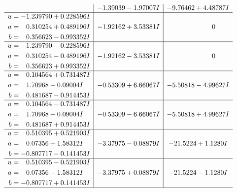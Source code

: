 \documentclass[1p]{elsarticle_modified}
\theoremstyle{definition}
\begin{document}
$$\begin{array}{c|c|c}
 & -1.39039 - 1.97007 I & -9.76462 + 4.48787 I \\ \hline\begin{aligned}
u &= -1.239790 + 0.228596 I \\
a &= \phantom{-}0.310254 + 0.489196 I \\
b &= \phantom{-}0.356623 - 0.993352 I\end{aligned}
 & -1.92162 + 3.53381 I & \phantom{-0.000000 } 0 \\ \hline\begin{aligned}
u &= -1.239790 - 0.228596 I \\
a &= \phantom{-}0.310254 - 0.489196 I \\
b &= \phantom{-}0.356623 + 0.993352 I\end{aligned}
 & -1.92162 - 3.53381 I & \phantom{-0.000000 } 0 \\ \hline\begin{aligned}
u &= \phantom{-}0.104564 + 0.731487 I \\
a &= \phantom{-}1.70968 - 0.09004 I \\
b &= \phantom{-}0.481687 - 0.914453 I\end{aligned}
 & -0.53309 + 6.66067 I & -5.50818 - 4.99627 I \\ \hline\begin{aligned}
u &= \phantom{-}0.104564 - 0.731487 I \\
a &= \phantom{-}1.70968 + 0.09004 I \\
b &= \phantom{-}0.481687 + 0.914453 I\end{aligned}
 & -0.53309 - 6.66067 I & -5.50818 + 4.99627 I \\ \hline\begin{aligned}
u &= \phantom{-}0.510395 + 0.521903 I \\
a &= \phantom{-}0.07356 + 1.58312 I \\
b &= -0.807717 - 0.141453 I\end{aligned}
 & -3.37975 - 0.08879 I & -21.5224 + 1.1280 I \\ \hline\begin{aligned}
u &= \phantom{-}0.510395 - 0.521903 I \\
a &= \phantom{-}0.07356 - 1.58312 I \\
b &= -0.807717 + 0.141453 I\end{aligned}
 & -3.37975 + 0.08879 I & -21.5224 - 1.1280 I\\
 \hline 
 \end{array}$$\newpage$$\begin{array}{c|c|c}  

\end{array}$$
\end{document}
